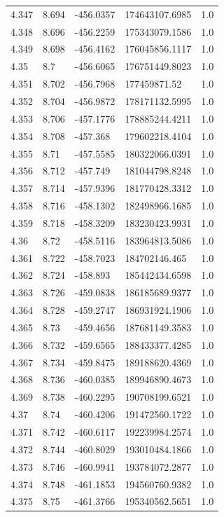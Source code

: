 \begin{tabular}{lllll}
4.347 & 8.694 & -456.0357 & 174643107.6985 & 1.0 \\
4.348 & 8.696 & -456.2259 & 175343079.1586 & 1.0 \\
4.349 & 8.698 & -456.4162 & 176045856.1117 & 1.0 \\
4.35 & 8.7 & -456.6065 & 176751449.8023 & 1.0 \\
4.351 & 8.702 & -456.7968 & 177459871.52 & 1.0 \\
4.352 & 8.704 & -456.9872 & 178171132.5995 & 1.0 \\
4.353 & 8.706 & -457.1776 & 178885244.4211 & 1.0 \\
4.354 & 8.708 & -457.368 & 179602218.4104 & 1.0 \\
4.355 & 8.71 & -457.5585 & 180322066.0391 & 1.0 \\
4.356 & 8.712 & -457.749 & 181044798.8248 & 1.0 \\
4.357 & 8.714 & -457.9396 & 181770428.3312 & 1.0 \\
4.358 & 8.716 & -458.1302 & 182498966.1685 & 1.0 \\
4.359 & 8.718 & -458.3209 & 183230423.9931 & 1.0 \\
4.36 & 8.72 & -458.5116 & 183964813.5086 & 1.0 \\
4.361 & 8.722 & -458.7023 & 184702146.465 & 1.0 \\
4.362 & 8.724 & -458.893 & 185442434.6598 & 1.0 \\
4.363 & 8.726 & -459.0838 & 186185689.9377 & 1.0 \\
4.364 & 8.728 & -459.2747 & 186931924.1906 & 1.0 \\
4.365 & 8.73 & -459.4656 & 187681149.3583 & 1.0 \\
4.366 & 8.732 & -459.6565 & 188433377.4285 & 1.0 \\
4.367 & 8.734 & -459.8475 & 189188620.4369 & 1.0 \\
4.368 & 8.736 & -460.0385 & 189946890.4673 & 1.0 \\
4.369 & 8.738 & -460.2295 & 190708199.6521 & 1.0 \\
4.37 & 8.74 & -460.4206 & 191472560.1722 & 1.0 \\
4.371 & 8.742 & -460.6117 & 192239984.2574 & 1.0 \\
4.372 & 8.744 & -460.8029 & 193010484.1866 & 1.0 \\
4.373 & 8.746 & -460.9941 & 193784072.2877 & 1.0 \\
4.374 & 8.748 & -461.1853 & 194560760.9382 & 1.0 \\
4.375 & 8.75 & -461.3766 & 195340562.5651 & 1.0 \\

\end{tabular}
